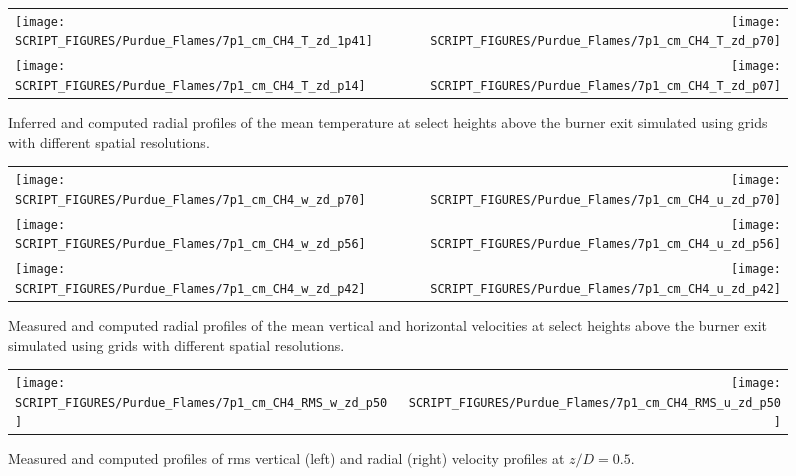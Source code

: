 \begin{figure}[p]
\begin{tabular*}{\textwidth}{l@{\extracolsep{\fill}}r}
\texttt{[image: SCRIPT\_FIGURES/Purdue\_Flames/7p1\_cm\_CH4\_T\_zd\_1p41]} &
\texttt{[image: SCRIPT\_FIGURES/Purdue\_Flames/7p1\_cm\_CH4\_T\_zd\_p70]} \\
\texttt{[image: SCRIPT\_FIGURES/Purdue\_Flames/7p1\_cm\_CH4\_T\_zd\_p14]} &
\texttt{[image: SCRIPT\_FIGURES/Purdue\_Flames/7p1\_cm\_CH4\_T\_zd\_p07]}
\end{tabular*}
\caption[Purdue 7.1 cm methane flame mean temperature profiles]
{Inferred \cite{Xin:CF2005} and computed radial profiles of the mean temperature at select heights above the burner exit simulated using grids with different spatial resolutions.}
\label{Purdue_7p1_CH4_temperature}
\end{figure}

\begin{figure}[p]
\begin{tabular*}{\textwidth}{l@{\extracolsep{\fill}}r}
\texttt{[image: SCRIPT\_FIGURES/Purdue\_Flames/7p1\_cm\_CH4\_w\_zd\_p70]} &
\texttt{[image: SCRIPT\_FIGURES/Purdue\_Flames/7p1\_cm\_CH4\_u\_zd\_p70]} \\
\texttt{[image: SCRIPT\_FIGURES/Purdue\_Flames/7p1\_cm\_CH4\_w\_zd\_p56]} &
\texttt{[image: SCRIPT\_FIGURES/Purdue\_Flames/7p1\_cm\_CH4\_u\_zd\_p56]} \\
\texttt{[image: SCRIPT\_FIGURES/Purdue\_Flames/7p1\_cm\_CH4\_w\_zd\_p42]} &
\texttt{[image: SCRIPT\_FIGURES/Purdue\_Flames/7p1\_cm\_CH4\_u\_zd\_p42]}
\end{tabular*}
\caption[Purdue 7.1 cm methane flame mean velocity profiles]
{Measured \cite{Zhou:CS1998} and computed radial profiles of the mean vertical and horizontal velocities at select heights above the burner exit simulated using grids with different spatial resolutions.}
\label{Purdue_7p1_CH4_vertical_velocity}
\end{figure}

\begin{figure}[p]
\begin{tabular*}{\textwidth}{l@{\extracolsep{\fill}}r}
\texttt{[image: SCRIPT\_FIGURES/Purdue\_Flames/7p1\_cm\_CH4\_RMS\_w\_zd\_p50]} &
\texttt{[image: SCRIPT\_FIGURES/Purdue\_Flames/7p1\_cm\_CH4\_RMS\_u\_zd\_p50]}
\end{tabular*}
\caption[Purdue 7.1 cm methane flame rms velocity profiles]
{Measured and computed profiles of rms vertical (left) and radial (right) velocity profiles at $z/D = 0.5$.}
\label{Purdue_7p1_CH4_vel_rms}
\end{figure}





